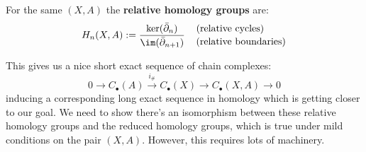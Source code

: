 \documentclass[a4paper]{article}
\begin{document}
\begin{dfn}
    For the same $(X,A)$ the \textbf{relative homology groups} are: \[
    H_n(X,A) := \frac{\ker(\bar{\partial}_n)}{\im(\bar{\partial}_{n+1})} \quad
    \genfrac{}{}{0pt}{}{\text{(relative cycles)\hspace{22pt}}}{\text{(relative boundaries)}}
    \]
\end{dfn}

\begin{exc}
\end{exc}
This gives us a nice short exact sequence of chain complexes: \[
    0\rightarrow C_\bullet(A)\xrightarrow{i_\#} C_\bullet(X) \rightarrow C_\bullet(X,A)\rightarrow 0
\]
inducing a corresponding long exact sequence in homology which is getting closer to our goal. We need to show there's an isomorphism between these relative homology groups and the reduced homology groups, which is true under mild conditions on the pair $(X,A)$. However, this requires lots of machinery.
\end{document}
